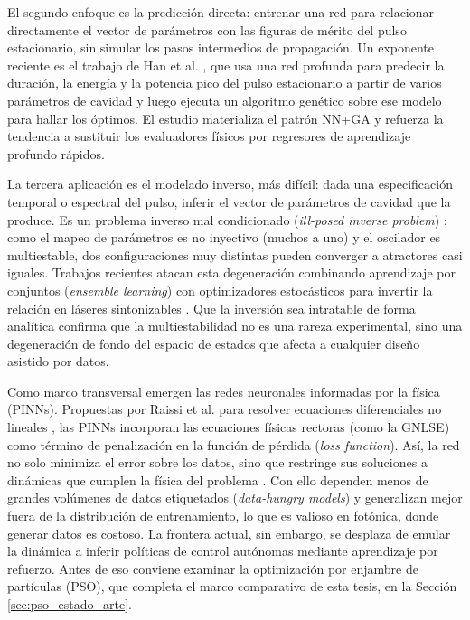 El segundo enfoque es la predicción directa: entrenar una red para relacionar directamente el vector de parámetros con las figuras de mérito del pulso estacionario, sin simular los pasos intermedios de propagación. Un exponente reciente es el trabajo de Han et al. \cite{Han2024}, que usa una red profunda para predecir la duración, la energía y la potencia pico del pulso estacionario a partir de varios parámetros de cavidad y luego ejecuta un algoritmo genético sobre ese modelo para hallar los óptimos. El estudio materializa el patrón NN+GA y refuerza la tendencia a sustituir los evaluadores físicos por regresores de aprendizaje profundo rápidos.

La tercera aplicación es el modelado inverso, más difícil: dada una especificación temporal o espectral del pulso, inferir el vector de parámetros de cavidad que la produce. Es un problema inverso mal condicionado (\emph{ill-posed inverse problem}) \cite{Tarantola2005}: como el mapeo de parámetros es no inyectivo (muchos a uno) y el oscilador es multiestable, dos configuraciones muy distintas pueden converger a atractores casi iguales. Trabajos recientes atacan esta degeneración combinando aprendizaje por conjuntos (\emph{ensemble learning}) con optimizadores estocásticos para invertir la relación en láseres sintonizables \cite{Han2025}. Que la inversión sea intratable de forma analítica confirma que la multiestabilidad no es una rareza experimental, sino una degeneración de fondo del espacio de estados que afecta a cualquier diseño asistido por datos.

Como marco transversal emergen las redes neuronales informadas por la física (PINNs). Propuestas por Raissi et al. para resolver ecuaciones diferenciales no lineales \cite{Raissi2019}, las PINNs incorporan las ecuaciones físicas rectoras (como la GNLSE) como término de penalización en la función de pérdida (\emph{loss function}). Así, la red no solo minimiza el error sobre los datos, sino que restringe sus soluciones a dinámicas que cumplen la física del problema \cite{Karniadakis2021}. Con ello dependen menos de grandes volúmenes de datos etiquetados (\emph{data-hungry models}) y generalizan mejor fuera de la distribución de entrenamiento, lo que es valioso en fotónica, donde generar datos es costoso. La frontera actual, sin embargo, se desplaza de emular la dinámica a inferir políticas de control autónomas mediante aprendizaje por refuerzo. Antes de eso conviene examinar la optimización por enjambre de partículas (PSO), que completa el marco comparativo de esta tesis, en la Sección \ref{sec:pso_estado_arte}.


